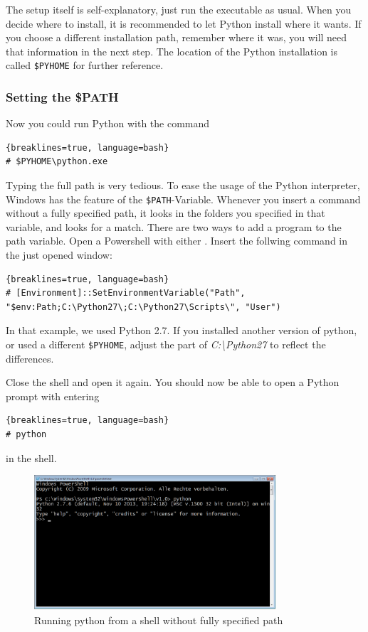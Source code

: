 The setup itself is self-explanatory, just run the executable as usual. When you decide where to install, it is recommended to let Python install where it wants. If you choose a different installation path, remember where it was, you will need that information in the next step. The location of the Python installation is called \texttt{\$PYHOME} for further reference.

\subsubsection{Setting the \$PATH}

Now you could run Python with the command

\begin{lstlisting}{breaklines=true, language=bash}
# $PYHOME\python.exe
\end{lstlisting}

Typing the full path is very tedious. To ease the usage of the Python interpreter, Windows has the feature of the \texttt{\$PATH}-Variable. Whenever you insert a command without a fully specified path, it looks in the folders you specified in that variable, and looks for a match. There are two ways to add a program to the path variable. Open a Powershell with either . Insert the follwing command in the just opened window: 

\begin{lstlisting}{breaklines=true, language=bash}
# [Environment]::SetEnvironmentVariable("Path", "$env:Path;C:\Python27\;C:\Python27\Scripts\", "User")
\end{lstlisting}

In that example, we used Python 2.7. If you installed another version of python, or used a different \texttt{\$PYHOME}, adjust the part of \textit{C:\textbackslash Python27} to reflect the differences. 

Close the shell and open it again. You should now be able to open a Python prompt with entering

\begin{lstlisting}{breaklines=true, language=bash}
# python
\end{lstlisting}

in the shell. 

\begin{figure}[ht]
    \centering
    \includegraphics[width=0.8\textwidth]{img/install-python.png}
    \caption{Running python from a shell without fully specified path}
    \label{fig:install-python}
\end{figure}


